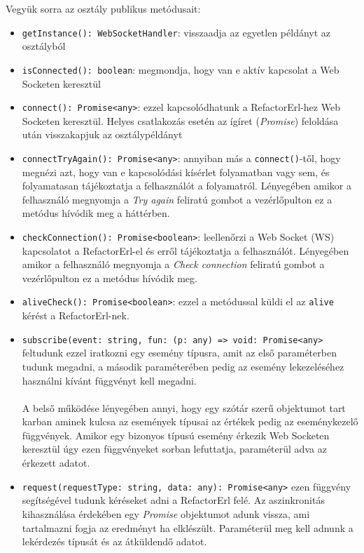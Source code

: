 \noindent Vegyük sorra az osztály publikus metódusait:

\begin{itemize}
    \item \lstinline{getInstance(): WebSocketHandler}: visszaadja az egyetlen példányt az osztályból 
    
    \item \lstinline{isConnected(): boolean}: megmondja, hogy van e aktív kapcsolat a Web Socketen keresztül
    
    \item \lstinline{connect(): Promise<any>}: ezzel kapcsolódhatunk a RefactorErl-hez Web Socketen keresztül. Helyes csatlakozás esetén az ígíret (\textit{Promise}) feloldása után visszakapjuk az osztálypéldányt
    
    \item \lstinline{connectTryAgain(): Promise<any>}: annyiban más a \lstinline{connect()}-től, hogy megnézi azt, hogy van e kapcsolódási kísérlet folyamatban vagy sem, és folyamatasan tájékoztatja a felhasználót a folyamatról. Lényegében amikor a felhasználó megnyomja a \textit{Try again} feliratú gombot a vezérlőpulton ez a metódus hívódik meg a háttérben.
    
    \item \lstinline{checkConnection(): Promise<boolean>}: leellenőrzi a Web Socket (WS) kapcsolatot a RefactorErl-el és erről tájékoztatja a felhasználót. Lényegében amikor a felhasználó megnyomja a \textit{Check connection} feliratú gombot a vezérlőpulton ez a metódus hívódik meg.
    
    \item \lstinline{aliveCheck(): Promise<boolean>}: ezzel a metódussal küldi el az \lstinline{alive} kérést a RefactorErl-nek.
    
    \item \lstinline{subscribe(event: string, fun: (p: any) => void: Promise<any>} feltudunk ezzel iratkozni egy esemény típusra, amit az első paraméterben tudunk megadni, a második paraméterében pedig az esemény lekezeléséhez használni kívánt függvényt kell megadni. \\ \\ A belső működése lényegében annyi, hogy egy szótár szerű objektumot tart karban aminek kulcsa az események típusai az értékek pedig az eseménykezelő függvények. Amikor egy bizonyos típusú esemény érkezik Web Socketen keresztül úgy ezen függvényeket sorban lefuttatja, paraméterül adva az érkezett adatot.
    
    \newpage
    
    \item \lstinline{request(requestType: string, data: any): Promise<any>} ezen függvény segítségével tudunk kéréseket adni a RefactorErl felé. Az aszinkronitás kihasználása érdekében egy \textit{Promise} objektumot adunk vissza, ami tartalmazni fogja az eredményt ha elklészült. Paraméterül meg kell adnunk a lekérdezés típusát és az átküldendő adatot.

\end{itemize}

